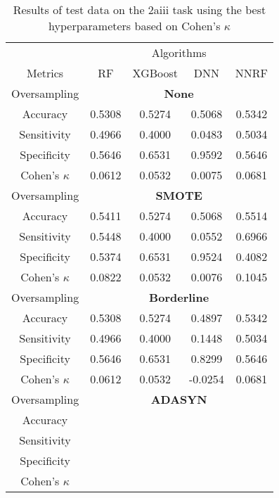 \begin{table}[!htb]
\centering
\caption{Results of test data on the 2aiii task using the best hyperparameters based on Cohen's $\kappa$}
\label{tab:2aiii_test_results}
\begin{tabular}{c | c c c c}
\hline
 & \multicolumn{4}{c}{Algorithms}\\ 
Metrics &RF & XGBoost & DNN & NNRF\\ 
\hline
Oversampling &\multicolumn{4}{|c}{\textbf{None}}\\ 
\hline
Accuracy & 0.5308 & 0.5274 & 0.5068 & 0.5342\\ 
Sensitivity & 0.4966 & 0.4000 & 0.0483 & 0.5034\\ 
Specificity & 0.5646 & 0.6531 & 0.9592 & 0.5646\\ 
Cohen's $\kappa$ & 0.0612 & 0.0532 & 0.0075 & 0.0681\\ 
\hline
Oversampling &\multicolumn{4}{|c}{\textbf{SMOTE}}\\ 
\hline
Accuracy & 0.5411 & 0.5274 & 0.5068 & 0.5514\\ 
Sensitivity & 0.5448 & 0.4000 & 0.0552 & 0.6966\\ 
Specificity & 0.5374 & 0.6531 & 0.9524 & 0.4082\\ 
Cohen's $\kappa$ & 0.0822 & 0.0532 & 0.0076 & 0.1045\\ 
\hline
Oversampling &\multicolumn{4}{|c}{\textbf{Borderline}}\\ 
\hline
Accuracy & 0.5308 & 0.5274 & 0.4897 & 0.5342\\ 
Sensitivity & 0.4966 & 0.4000 & 0.1448 & 0.5034\\ 
Specificity & 0.5646 & 0.6531 & 0.8299 & 0.5646\\ 
Cohen's $\kappa$ & 0.0612 & 0.0532 & -0.0254 & 0.0681\\ 
\hline
Oversampling &\multicolumn{4}{|c}{\textbf{ADASYN}}\\ 
\hline
Accuracy &  &  &  & \\ 
Sensitivity &  &  &  & \\ 
Specificity &  &  &  & \\ 
Cohen's $\kappa$ &  &  &  & \\ 
\hline
\end{tabular}
\end{table}


